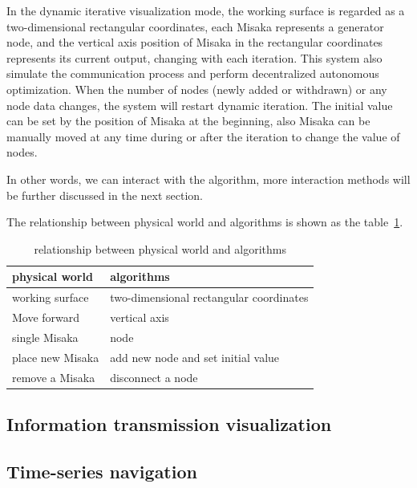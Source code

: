 \documentclass[conference]{IEEEtran}
\begin{document}
In the dynamic iterative visualization mode, the working surface is regarded as a two-dimensional rectangular coordinates, each Misaka represents a generator node, and the vertical axis position of Misaka in the rectangular coordinates represents its current output, changing with each iteration. This system also simulate the communication process and perform decentralized autonomous optimization. When the number of nodes (newly added or withdrawn) or any node data changes, the system will restart dynamic iteration. The initial value can be set by the position of Misaka at the beginning, also Misaka can be manually moved at any time during or after the iteration to change the value of nodes.

In other words, we can interact with the algorithm, more interaction methods will be further discussed in the next section.

The relationship between physical world and algorithms is shown as the table~\ref{tab:Real-Unreal}.

\begin{table}[htbp]
    \centering
    \begin{tabular}{@{}ll@{}}
    \hline
    physical world          & algorithms                               \\ \hline
    working surface         & two-dimensional rectangular coordinates  \\
    Move forward            & vertical axis                            \\
    single Misaka           & node                                     \\
    place new Misaka        & add new node and set initial value       \\
    remove a Misaka         & disconnect a node                        \\ \hline
    \end{tabular}
    \caption{relationship between physical world and algorithms}
    \label{tab:Real-Unreal}
\end{table}



\subsection{Information transmission visualization}

\subsection{Time-series navigation}
\end{document}
